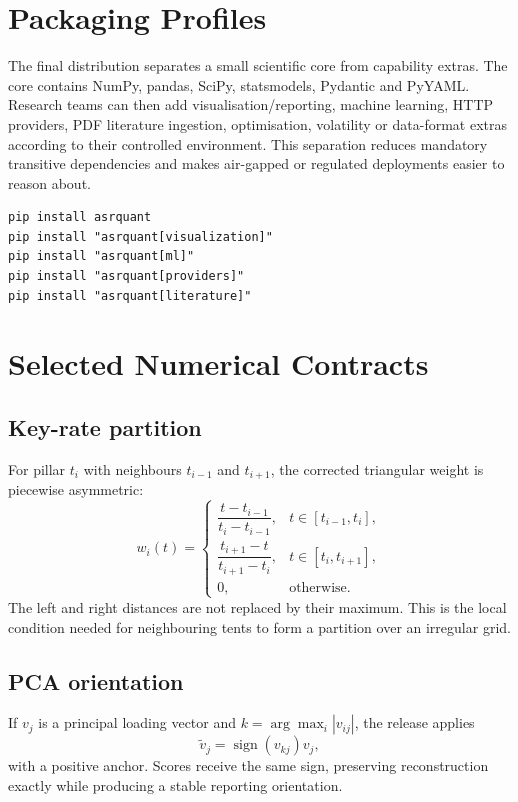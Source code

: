 \documentclass{asrpaper}
\begin{document}
\section{Packaging Profiles}
The final distribution separates a small scientific core from capability extras. The core contains NumPy, pandas, SciPy, statsmodels, Pydantic and PyYAML. Research teams can then add visualisation/reporting, machine learning, HTTP providers, PDF literature ingestion, optimisation, volatility or data-format extras according to their controlled environment. This separation reduces mandatory transitive dependencies and makes air-gapped or regulated deployments easier to reason about.

\begin{lstlisting}
pip install asrquant
pip install "asrquant[visualization]"
pip install "asrquant[ml]"
pip install "asrquant[providers]"
pip install "asrquant[literature]"
\end{lstlisting}

\section{Selected Numerical Contracts}
\subsection{Key-rate partition}
For pillar $t_i$ with neighbours $t_{i-1}$ and $t_{i+1}$, the corrected triangular weight is piecewise asymmetric:
\begin{equation}
w_i(t)=\begin{cases}
\dfrac{t-t_{i-1}}{t_i-t_{i-1}}, & t\in[t_{i-1},t_i],\\[1.5mm]
\dfrac{t_{i+1}-t}{t_{i+1}-t_i}, & t\in[t_i,t_{i+1}],\\[1.5mm]
0,&\text{otherwise.}
\end{cases}
\end{equation}
The left and right distances are not replaced by their maximum. This is the local condition needed for neighbouring tents to form a partition over an irregular grid.

\subsection{PCA orientation}
If $v_j$ is a principal loading vector and $k=\arg\max_i|v_{ij}|$, the release applies
\begin{equation}
\tilde v_j=\operatorname{sign}(v_{kj})v_j,
\end{equation}
with a positive anchor. Scores receive the same sign, preserving reconstruction exactly while producing a stable reporting orientation.
\end{document}
